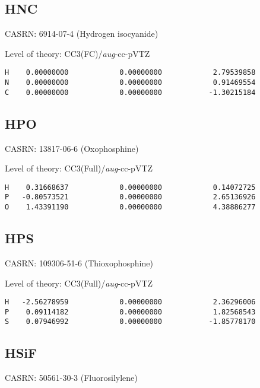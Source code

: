 \documentclass[journal=jctcce,manuscript=article,layout=traditional]{achemso}
\newcommand{\AVTZ}{\emph{aug}-cc-pVTZ}
\begin{document}
\subsection{HNC}

CASRN: 6914-07-4 (Hydrogen isocyanide)

\begin{singlespace}
\noindent  Level of theory: CC3(FC)/{\AVTZ}
\begin{verbatim}
H    0.00000000            0.00000000            2.79539858
N    0.00000000            0.00000000            0.91469554
C    0.00000000            0.00000000           -1.30215184
\end{verbatim}
\end{singlespace}

\subsection{HPO}

CASRN: 13817-06-6 (Oxophosphine)

\begin{singlespace}
\noindent  Level of theory: CC3(Full)/{\AVTZ}
\begin{verbatim}
H    0.31668637            0.00000000            0.14072725
P   -0.80573521            0.00000000            2.65136926
O    1.43391190            0.00000000            4.38886277
\end{verbatim}
\end{singlespace}

\subsection{HPS}

CASRN: 109306-51-6 (Thioxophosphine)

\begin{singlespace}
\noindent  Level of theory: CC3(Full)/{\AVTZ}
\begin{verbatim}
H   -2.56278959            0.00000000            2.36296006
P    0.09114182            0.00000000            1.82568543
S    0.07946992            0.00000000           -1.85778170
\end{verbatim}
\end{singlespace}

\subsection{HSiF}

CASRN: 50561-30-3 (Fluorosilylene)
\end{document}
